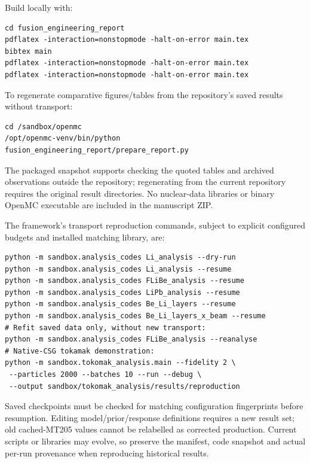 Build locally with:
\begin{lstlisting}
cd fusion_engineering_report
pdflatex -interaction=nonstopmode -halt-on-error main.tex
bibtex main
pdflatex -interaction=nonstopmode -halt-on-error main.tex
pdflatex -interaction=nonstopmode -halt-on-error main.tex
\end{lstlisting}

To regenerate comparative figures/tables from the repository's saved results without transport:
\begin{lstlisting}
cd /sandbox/openmc
/opt/openmc-venv/bin/python fusion_engineering_report/prepare_report.py
\end{lstlisting}
The packaged snapshot supports checking the quoted tables and archived observations outside the repository; regenerating from the current repository requires the original result directories. No nuclear-data libraries or binary OpenMC executable are included in the manuscript ZIP.

The framework's transport reproduction commands, subject to explicit configured budgets and installed matching library, are:
\begin{lstlisting}
python -m sandbox.analysis_codes Li_analysis --dry-run
python -m sandbox.analysis_codes Li_analysis --resume
python -m sandbox.analysis_codes FLiBe_analysis --resume
python -m sandbox.analysis_codes LiPb_analysis --resume
python -m sandbox.analysis_codes Be_Li_layers --resume
python -m sandbox.analysis_codes Be_Li_layers_x_beam --resume
# Refit saved data only, without new transport:
python -m sandbox.analysis_codes FLiBe_analysis --reanalyse
# Native-CSG tokamak demonstration:
python -m sandbox.tokomak_analysis.main --fidelity 2 \
 --particles 2000 --batches 10 --run --debug \
 --output sandbox/tokomak_analysis/results/reproduction
\end{lstlisting}
Saved checkpoints must be checked for matching configuration fingerprints before resumption. Editing model/prior/response definitions requires a new result set; old cached-MT205 values cannot be relabelled as corrected production. Current scripts or libraries may evolve, so preserve the manifest, code snapshot and actual per-run provenance when reproducing historical results.
